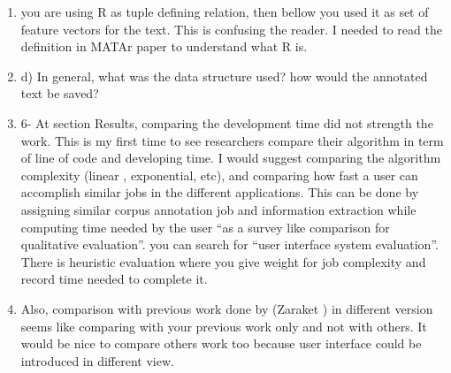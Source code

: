 \begin{enumerate}[leftmargin=0mm,label=\bfseries CommentR3.\arabic*]
\item \label{Review.3.22}
you are using R as tuple defining relation, 
then bellow you used it as set of feature vectors for the text. 
This is confusing the reader. 
I needed to read the definition in MATAr paper to understand 
what R is.



\item \label{Review.3.23}
d) In general, what was the data structure used? 
how would the annotated text be saved?


\item \label{Review.3.24}
6- At section Results, comparing the development time 
did not strength the work. 
This is my first time to see researchers compare their 
algorithm in term of line of code and developing time. 
I would suggest comparing the algorithm complexity 
(linear , exponential, etc), and comparing how fast a user can 
accomplish similar jobs in the different applications. 
This can be done by assigning similar corpus annotation job 
and information extraction while computing time needed by 
the user 
``as a survey like comparison for qualitative evaluation''. 
you can search for ``user interface system evaluation''. 
There is heuristic evaluation where you give weight for job 
complexity and record time needed to complete it.



\item \label{Review.3.25}
Also, comparison with previous work done by (Zaraket ) 
in different version seems like comparing with your previous work 
only and not with others. 
It would be nice to compare others work too because user 
interface could be introduced in different view.


\end{enumerate}
